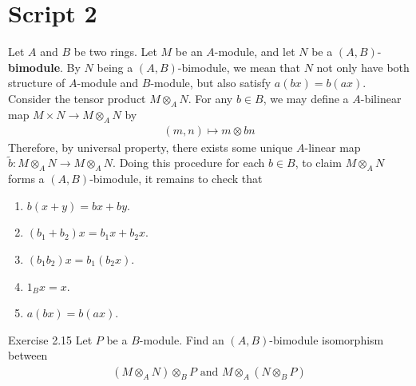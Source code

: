 \documentclass{report}
\begin{document}
\section{Script 2}
Let $A$ and  $B$ be two rings. Let  $M$ be an  $A$-module, and let $N$ be a  $(A,B)$-\textbf{bimodule}. By $N$ being a  $(A,B)$-bimodule, we mean that $N$ not only have both structure of $A$-module and $B$-module, but also  satisfy $a(bx)=b(ax)$. Consider the tensor product $M\otimes_A N$. For any $b \in B$, we may define a $A$-bilinear map $M\times N \rightarrow M\otimes_A N$ by 
\begin{align*}
  (m,n)\mapsto m \otimes  bn
\end{align*}
Therefore, by universal property, there exists some unique $A$-linear map $\tilde{b}:M\otimes _A N\rightarrow M\otimes  _A N$. Doing this procedure for each $b \in B$, to claim $M\otimes_A N$ forms a $(A,B)$-bimodule, it remains to check that 
\begin{enumerate}[label=(\alph*)]
  \item $b(x+y)=bx+by$. 
  \item $(b_1+b_2)x=b_1x+b_2x$. 
  \item $(b_1b_2)x=b_1(b_2x)$. 
  \item $1_Bx=x$. 
  \item $a(bx)=b(ax)$. 
\end{enumerate}
\begin{question}{Exercise 2.15}{}
Let $P$ be a  $B$-module. Find an $(A,B)$-bimodule isomorphism  between 
\begin{align*}
  (M\otimes _AN)\otimes _B P \text{ and }M \otimes  _A (N \otimes  _B P)
\end{align*}
\end{question}
\end{document}
